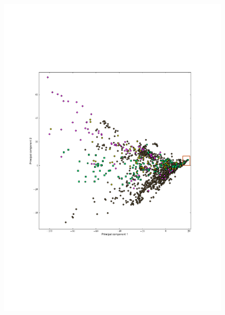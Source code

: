 \begin{figure}
\begin{minipage}{0.55\textwidth}
		\label{figpcavg}
	\end{minipage}
	\begin{minipage}{0.55\textwidth}
		\includegraphics[trim=2cm 7cm 2cm 6cm,clip,width=\textwidth]{./img/pca_genome_II.png}
		\label{figpcavg2}
	\end{minipage}
	\begin{center}
	\begin{minipage}{0.55\textwidth}

\end{minipage}
\end{center}
\end{figure}
